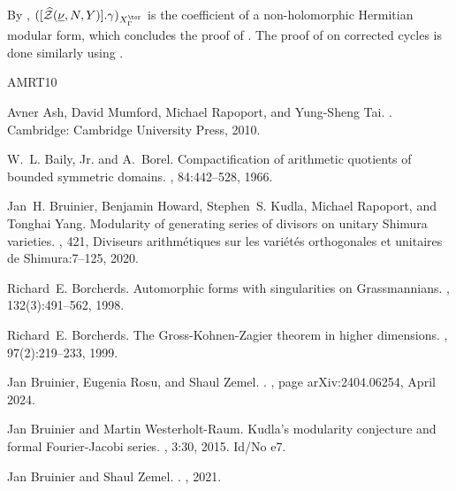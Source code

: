 \documentclass[11pt,letterpaper,english]{amsart}
\numberwithin{equation}{subsection}
\numberwithin{equation}{section}
\newcommand\cZ{{\mathcal Z}}
\theoremstyle{plain}
\theoremstyle{remark}
\begin{document}
By , $([\widehat{\cZ}(\underline{\nu},N,Y)].\gamma)_{X^{\tor}_{\Gamma}}$ is the coefficient of a non-holomorphic Hermitian modular form, which concludes the proof of . The proof of  on corrected cycles is done similarly using . 

\newcommand{\etalchar}[1]{$^{#1}$}
\begin{thebibliography}{AMRT10}

Avner {Ash}, David {Mumford}, Michael {Rapoport}, and Yung-Sheng {Tai}.
.
\newblock Cambridge: Cambridge University Press, 2010.

W.~L. Baily, Jr. and A.~Borel.
\newblock Compactification of arithmetic quotients of bounded symmetric
  domains.
, 84:442--528, 1966.

\bibitem[BHK{\etalchar{+}}20]{bruinier-howard-kudla-yang}
Jan~H. Bruinier, Benjamin Howard, Stephen~S. Kudla, Michael Rapoport, and
  Tonghai Yang.
\newblock Modularity of generating series of divisors on unitary {S}himura
  varieties.
, 421, Diviseurs arithm\'{e}tiques sur les
  vari\'{e}t\'{e}s orthogonales et unitaires de Shimura:7--125, 2020.

Richard~E. Borcherds.
\newblock Automorphic forms with singularities on {G}rassmannians.
, 132(3):491--562, 1998.

Richard~E. Borcherds.
\newblock The {G}ross-{K}ohnen-{Z}agier theorem in higher dimensions.
, 97(2):219--233, 1999.

Jan {Bruinier}, Eugenia {Rosu}, and Shaul {Zemel}.
.
, page arXiv:2404.06254, April 2024.

Jan Bruinier and Martin Westerholt-Raum.
\newblock Kudla's modularity conjecture and formal {Fourier}-{Jacobi} series.
, 3:30, 2015.
\newblock Id/No e7.

Jan {Bruinier} and Shaul {Zemel}.
.
, 2021.


\end{thebibliography}
\end{document}
